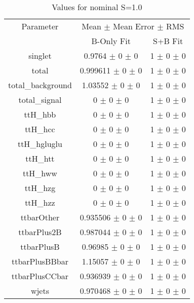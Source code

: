 \begin{table}
\centering
\caption{Values for nominal S=1.0}
\begin{tabular}{ccc}
\toprule
Parameter 	& \multicolumn{2}{c}{Mean $\pm$ Mean Error $\pm$ RMS}\\
 	& B-Only Fit & S+B Fit\\
\midrule
singlet 	& \num{0.9764} $\pm$ \num{0} $\pm$ \num{0} 	& \num{1} $\pm$ \num{0} $\pm$ \num{0}\\
total 	& \num{0.999611} $\pm$ \num{0} $\pm$ \num{0} 	& \num{1} $\pm$ \num{0} $\pm$ \num{0}\\
total\_background 	& \num{1.03552} $\pm$ \num{0} $\pm$ \num{0} 	& \num{1} $\pm$ \num{0} $\pm$ \num{0}\\
total\_signal 	& \num{0} $\pm$ \num{0} $\pm$ \num{0} 	& \num{1} $\pm$ \num{0} $\pm$ \num{0}\\
ttH\_hbb 	& \num{0} $\pm$ \num{0} $\pm$ \num{0} 	& \num{1} $\pm$ \num{0} $\pm$ \num{0}\\
ttH\_hcc 	& \num{0} $\pm$ \num{0} $\pm$ \num{0} 	& \num{1} $\pm$ \num{0} $\pm$ \num{0}\\
ttH\_hgluglu 	& \num{0} $\pm$ \num{0} $\pm$ \num{0} 	& \num{1} $\pm$ \num{0} $\pm$ \num{0}\\
ttH\_htt 	& \num{0} $\pm$ \num{0} $\pm$ \num{0} 	& \num{1} $\pm$ \num{0} $\pm$ \num{0}\\
ttH\_hww 	& \num{0} $\pm$ \num{0} $\pm$ \num{0} 	& \num{1} $\pm$ \num{0} $\pm$ \num{0}\\
ttH\_hzg 	& \num{0} $\pm$ \num{0} $\pm$ \num{0} 	& \num{1} $\pm$ \num{0} $\pm$ \num{0}\\
ttH\_hzz 	& \num{0} $\pm$ \num{0} $\pm$ \num{0} 	& \num{1} $\pm$ \num{0} $\pm$ \num{0}\\
ttbarOther 	& \num{0.935506} $\pm$ \num{0} $\pm$ \num{0} 	& \num{1} $\pm$ \num{0} $\pm$ \num{0}\\
ttbarPlus2B 	& \num{0.987044} $\pm$ \num{0} $\pm$ \num{0} 	& \num{1} $\pm$ \num{0} $\pm$ \num{0}\\
ttbarPlusB 	& \num{0.96985} $\pm$ \num{0} $\pm$ \num{0} 	& \num{1} $\pm$ \num{0} $\pm$ \num{0}\\
ttbarPlusBBbar 	& \num{1.15057} $\pm$ \num{0} $\pm$ \num{0} 	& \num{1} $\pm$ \num{0} $\pm$ \num{0}\\
ttbarPlusCCbar 	& \num{0.936939} $\pm$ \num{0} $\pm$ \num{0} 	& \num{1} $\pm$ \num{0} $\pm$ \num{0}\\
wjets 	& \num{0.970468} $\pm$ \num{0} $\pm$ \num{0} 	& \num{1} $\pm$ \num{0} $\pm$ \num{0}\\
\bottomrule
\end{tabular}
\end{table}